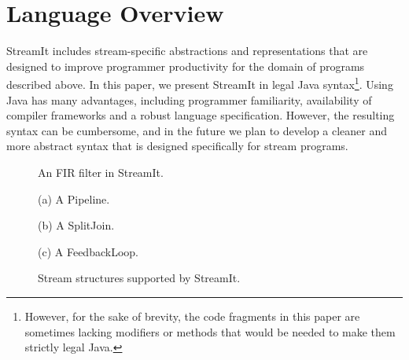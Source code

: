 
\section{Language Overview}
\label{sec:overview}

StreamIt includes stream-specific abstractions and representations
that are designed to improve programmer productivity for the domain of
programs described above.  In this paper, we present StreamIt in legal
Java syntax\footnote{However, for the sake of brevity, the code
fragments in this paper are sometimes lacking modifiers or methods
that would be needed to make them strictly legal Java.}.  Using Java
has many advantages, including programmer familiarity, availability of
compiler frameworks and a robust language specification.  However, the
resulting syntax can be cumbersome, and in the future we plan to
develop a cleaner and more abstract syntax that is designed
specifically for stream programs.

\begin{figure}[t]
\begin{minipage}{2.05in}
\caption{\protect\small An FIR filter in StreamIt.~~~~~
\protect\label{fig:firstreamit}}
\end{minipage}
\begin{minipage}{2.75in}
\centering
\vspace{10pt}

(a) A Pipeline. \\
\vspace{10pt}

(b) A SplitJoin. \\
\vspace{10pt}

(c) A FeedbackLoop. \\
\caption{\protect\small Stream structures supported by StreamIt.
\protect\label{fig:structuresp}
}
\end{minipage}
\vspace{-18pt}
\end{figure}

